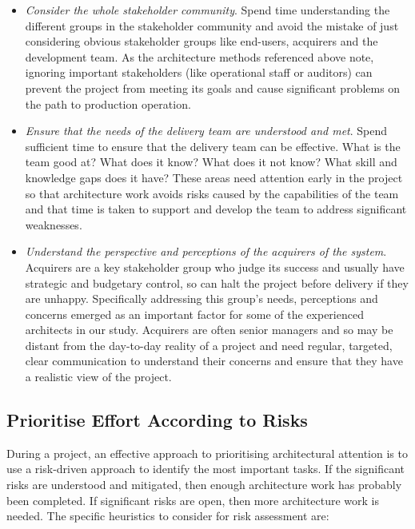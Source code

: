 \begin{itemize}
	\item \emph{Consider the whole stakeholder community}. Spend time understanding the different groups in the stakeholder community and avoid the mistake of just considering obvious stakeholder groups like end-users, acquirers and the development team.  As the architecture methods referenced above note, ignoring important stakeholders (like operational staff or auditors) can prevent the project from meeting its goals and cause significant problems on the path to production operation.
	\item \emph{Ensure that the needs of the delivery team are understood and met}.  Spend sufficient time to ensure that the delivery team can be effective.  What is the team good at?  What does it know?  What does it not know?  What skill and knowledge gaps does it have?  These areas need attention early in the project so that architecture work avoids risks caused by the capabilities of the team and that time is taken to support and develop the team to address significant weaknesses.
	\item \emph{Understand the perspective and perceptions of the acquirers of the system}.  Acquirers are a key stakeholder group who judge its success and usually have strategic and budgetary control, so can halt the project before delivery if they are unhappy.  Specifically addressing this group's needs, perceptions and concerns emerged as an important factor for some of the experienced architects in our study.  Acquirers are often senior managers and so may be distant from the day-to-day reality of a project and need regular, targeted, clear communication to understand their concerns and ensure that they have a realistic view of the project. 
\end{itemize}

\subsection{Prioritise Effort According to Risks}

During a project, an effective approach to prioritising architectural attention is to use a risk-driven approach to identify the most important tasks.  If the significant risks are understood and mitigated, then enough architecture work has probably been completed.  If significant risks are open, then more architecture work is needed. The specific heuristics to consider for risk assessment are:

